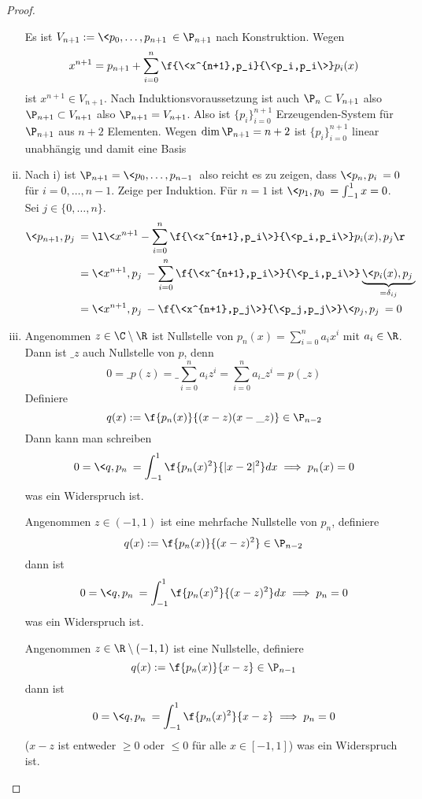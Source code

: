 \documentclass[11pt]{scrbook}
\begin{document}
\begin{lem}
\begin{proof}
\begin{enumerate}[i)]
				Es ist $V_{n+1} := \<p_0,\dotsc,p_{n+1}\> \in \P_{n+1}$ nach Konstruktion.
				Wegen
				\[
					x^{n+1} = p_{n+1} + \sum_{i=0}^n \f {\<x^{n+1},p_i}{\<p_i,p_i\>} p_i(x)
				\]
				ist $x^{n+1} \in V_{n+1}$.
				Nach Induktionsvoraussetzung ist auch $\P_n \subset V_{n+1}$ also $\P_{n+1}\subset V_{n+1}$ also $\P_{n+1} = V_{n+1}$.
				Also ist $\{p_i\}_{i=0}^{n+1}$ Erzeugenden-System für $\P_{n+1}$ aus $n+2$ Elementen.
				Wegen $\dim \P_{n+1} = n+2$ ist $\{p_i\}_{i=0}^{n+1}$ linear unabhängig und damit eine Basis
			\item
				Nach i) ist $\P_{n+1} = \<p_0,\dotsc, p_{n-1}\>$ also reicht es zu zeigen, dass $\<p_n,p_i\>=0$ für $i=0,\dotsc, n-1$.
				Zeige per Induktion.
				Für $n=1$ ist $\<p_1,p_0\> = \int_{-1}^1 x = 0$.
				Sei $j\in \{0,\dotsc,n\}$.
				\begin{align*}
					\<p_{n+1},p_j\> 
					&= \l\< x^{n+1}- \sum_{i=0}^n \f {\<x^{n+1},p_i\>}{\<p_i,p_i\>} p_i(x) , p_j\r\> \\
					&= \<x^{n+1},p_j\> - \sum_{i=0}^n \f{\<x^{n+1},p_i\>}{\<p_i,p_i\>} \underbrace{\<p_i(x),p_j\> }_{= \delta_{ij}} \\
					&= \<x^{n+1},p_j\> - \f {\<x^{n+1},p_j\>}{\<p_j,p_j\>} \<p_j,p_j\> = 0
				\end{align*}
			\item
				Angenommen $z\in \C\setminus \R$ ist Nullstelle von $p_n(x) = \sum_{i=0}^n a_i x^i$ mit $a_i\in \R$.
				Dann ist $\_z$ auch Nullstelle von $p$, denn
				\[
					0 = \_{p(z)} = \_{\sum_{i=0}^n a_i z^i} = \sum_{i=0}^n a_i\_{z}^i = p(\_z)
				\]
				Definiere
				\[
					q(x) := \f {p_n(x)}{(x-z)(x-\_z)} \in \P_{n-2}
				\]
				Dann kann man schreiben
				\[
					0 = \<q,p_n\> = \int_{-1}^1 \f {p_n(x)^2}{|x-2|^2} dx \implies p_n(x) = 0
				\]
				was ein Widerspruch ist.

				Angenommen $z\in (-1,1)$ ist eine mehrfache Nullstelle von $p_n$, definiere
				\[
					q(x) := \f {p_n(x)}{(x-z)^2} \in \P_{n-2}
				\]
				dann ist
				\[
					0= \<q,p_n\> = \int_{-1}^1 \f {p_n(x)^2}{(x-z)^2} dx  \implies p_n = 0
				\]
				was ein Widerspruch ist.

				Angenommen $z\in \R\setminus (-1,1)$ ist eine Nullstelle, definiere
				\[
					q(x) := \f {p_n(x)}{x-z} \in \P_{n-1}
				\]
				dann ist
				\[
					0 = \<q,p_n\> = \int_{-1}^1 \f{p_n(x)^2}{x-z} \implies p_n = 0
				\]
				($x-z$ ist entweder $\ge 0$ oder $\le 0$ für alle $x\in [-1,1]$)
				was ein Widerspruch ist.


		\end{enumerate}
	\end{proof}
\end{lem}
\end{document}
